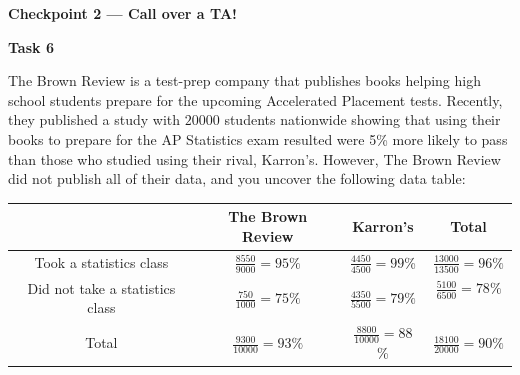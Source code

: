 \documentclass[12pt,letterpaper]{article}
\begin{document}
\textbf{Checkpoint 2 — Call over a TA!}

\newpage

\textbf{Task 6}

    The Brown Review is a test-prep company that publishes books helping high school students prepare for the upcoming Accelerated Placement tests. Recently, they published a study with $20000$ students nationwide showing that using their books to prepare for the AP Statistics exam resulted were 5\% more likely to pass than those who studied using their rival, Karron's. However, The Brown Review did not publish all of their data, and you uncover the following data table:
    \begin{center}
    \renewcommand{\arraystretch}{2}
    \begin{tabular}{| c | c | c | c |}
        \hline  & The Brown Review & Karron's & Total\\ 
        \hline Took a statistics class & $\frac{8550}{9000} = 95\%$ & $\frac{4450}{4500} = 99$\% & $\frac{13000}{13500} = 96 \%$\\
        \hline Did not take a statistics class & $\frac{750}{1000} = 75\%$ & $\frac{4350}{5500} = 79\%$ & $\frac{5100}{6500} = 78\%$\ \\
        \hline Total & $\frac{9300}{10000} = 93\%$ & $\frac{8800}{10000} = 88$\% & $\frac{18100}{20000} = 90\%$ \\
        \hline 
    \end{tabular}

    
    \renewcommand{\arraystretch}{1}
    \end{center}
\end{document}

